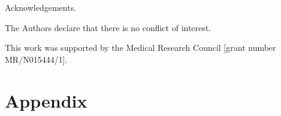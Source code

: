 \documentclass[sagev, Crown]{sagej} %
\begin{document}
\begin{acks}
Acknowledgements.
\end{acks}

\begin{dci}
The Authors declare that there is no conflict of interest.
\end{dci}

\begin{funding}
This work was supported by the Medical Research Council [grant number MR/N015444/1].
\end{funding}




\section*{Appendix}
\end{document}
